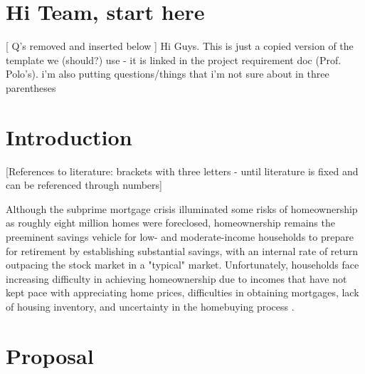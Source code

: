 \documentclass[sigconf,nonacm,11pt]{acmart}
\begin{document}
\section{Hi Team, start here}
[ Q's removed and inserted below ]
Hi Guys. This is just a copied version of the template we (should?) use - it is linked in the project requirement doc (Prof. Polo's).\newline
i'm also putting questions/things that i'm not sure about in three parentheses

\section{Introduction}

[References to literature: brackets with three letters - until literature is fixed and can be referenced through numbers]

Although the subprime mortgage crisis illuminated some risks of homeownership as roughly eight million homes were foreclosed, homeownership remains the preeminent savings vehicle for low- and moderate-income households to prepare for retirement by establishing substantial savings, with an internal rate of return outpacing the stock market in a "typical" market. Unfortunately, households face increasing difficulty in achieving homeownership due to incomes that have not kept pace with appreciating home prices, difficulties in obtaining mortgages, lack of housing inventory, and uncertainty in the homebuying process \cite{Goodman2018}.

\section{Proposal}
\end{document}
